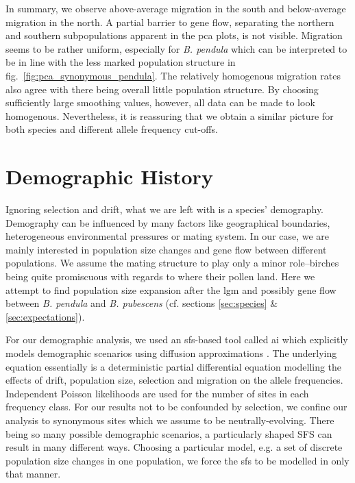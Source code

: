 \documentclass[hidelinks,11pt]{article}
\newcommand{\dadi}{\textdelta a\textdelta i}
\newcommand{\pendula}{\textit{B. pendula}}
\newcommand{\pubescens}{\textit{B. pubescens}}
\begin{document}
    In summary, we observe above-average migration in the south and below-average migration in the north. A partial barrier to gene flow, separating the northern and southern subpopulations apparent in the \acrshort{pca} plots, is not visible. Migration seems to be rather uniform, especially for \pendula{} which can be interpreted to be in line with the less marked population structure in fig.~\ref{fig:pca_synonymous_pendula}. The relatively homogenous migration rates also agree with there being overall little population structure. By choosing sufficiently large smoothing values, however, all data can be made to look homogenous. Nevertheless, it is reassuring that we obtain a similar picture for both species and different allele frequency cut-offs.

    \clearpage


    \section{Demographic History}
    \label{sec:demographic-history}

    Ignoring selection and drift, what we are left with is a species' demography. Demography can be influenced by many factors like geographical boundaries, heterogeneous environmental pressures or mating system. In our case, we are mainly interested in population size changes and gene flow between different populations. We assume the mating structure to play only a minor role--birches being quite promiscuous with regards to where their pollen land. Here we attempt to find population size expansion after the \acrlong{lgm} and possibly gene flow between \pendula{} and \pubescens{} (cf. sections \ref{sec:species} \& \ref{sec:expectations}).

    For our demographic analysis, we used an \acrshort{sfs}-based tool called \dadi{} which explicitly models demographic scenarios using diffusion approximations \cite{dadi}. The underlying equation essentially is a deterministic partial differential equation modelling the effects of drift, population size, selection and migration on the allele frequencies. Independent Poisson likelihoods are used for the number of sites in each frequency class. For our results not to be confounded by selection, we confine our analysis to synonymous sites which we assume to be neutrally-evolving. There being so many possible demographic scenarios, a particularly shaped SFS can result in many different ways. Choosing a particular model, e.g. a set of discrete population size changes in one population, we force the \acrshort{sfs} to be modelled in only that manner.
\end{document}
